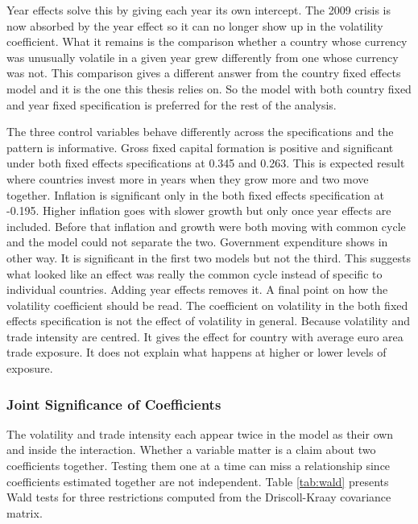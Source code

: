 Year effects solve this by giving each year its own intercept.
The 2009 crisis is now absorbed by the year effect so it can no longer show up in the volatility coefficient.
What it remains is the comparison whether a country whose currency was unusually volatile in a given year grew differently from one whose currency was not.
This comparison gives a different answer from the country fixed effects model and it is the one this thesis relies on.
So the model with both country fixed and year fixed specification is preferred for the rest of the analysis.

\vspace{\baselineskip}
The three control variables behave differently across the specifications and the pattern is informative.
Gross fixed capital formation is positive and significant under both fixed effects specifications at 0.345 and 0.263.
This is expected result where countries invest more in years when they grow more and two move together.
Inflation is significant only in the both fixed effects specification at -0.195.
Higher inflation goes with slower growth but only once year effects are included.
Before that inflation and growth were both moving with common cycle and the model could not separate the two.
Government expenditure shows in other way. 
It is significant in the first two models but not the third.
This suggests what looked like an effect was really the common cycle instead of specific to individual countries.
Adding year effects removes it.
A final point on how the volatility coefficient should be read.
The coefficient on volatility in the both fixed effects specification is not the effect of volatility in general.
Because volatility and trade intensity are centred.
It gives the effect for country with average euro area trade exposure.
It does not explain what happens at higher or lower levels of exposure.


\subsubsection{Joint Significance of Coefficients}\label{joint_sign}

The volatility and trade intensity each appear twice in the model as their own and inside the interaction.
Whether a variable matter is a claim about two coefficients together.
Testing them one at a time can miss a relationship since coefficients estimated together are not independent.
Table \ref{tab:wald} presents Wald tests for three restrictions computed from the Driscoll-Kraay covariance matrix.

